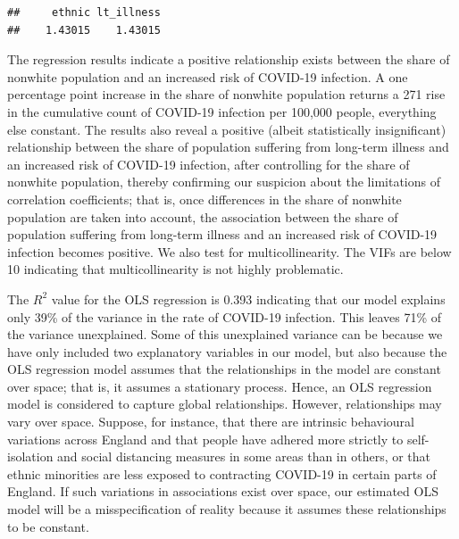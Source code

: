 \documentclass[
]{book}
\begin{document}
\begin{verbatim}
##     ethnic lt_illness 
##    1.43015    1.43015
\end{verbatim}

The regression results indicate a positive relationship exists between the share of nonwhite population and an increased risk of COVID-19 infection. A one percentage point increase in the share of nonwhite population returns a 271 rise in the cumulative count of COVID-19 infection per 100,000 people, everything else constant. The results also reveal a positive (albeit statistically insignificant) relationship between the share of population suffering from long-term illness and an increased risk of COVID-19 infection, after controlling for the share of nonwhite population, thereby confirming our suspicion about the limitations of correlation coefficients; that is, once differences in the share of nonwhite population are taken into account, the association between the share of population suffering from long-term illness and an increased risk of COVID-19 infection becomes positive. We also test for multicollinearity. The VIFs are below 10 indicating that multicollinearity is not highly problematic.

The \(R^{2}\) value for the OLS regression is 0.393 indicating that our model explains only 39\% of the variance in the rate of COVID-19 infection. This leaves 71\% of the variance unexplained. Some of this unexplained variance can be because we have only included two explanatory variables in our model, but also because the OLS regression model assumes that the relationships in the model are constant over space; that is, it assumes a stationary process. Hence, an OLS regression model is considered to capture global relationships. However, relationships may vary over space. Suppose, for instance, that there are intrinsic behavioural variations across England and that people have adhered more strictly to self-isolation and social distancing measures in some areas than in others, or that ethnic minorities are less exposed to contracting COVID-19 in certain parts of England. If such variations in associations exist over space, our estimated OLS model will be a misspecification of reality because it assumes these relationships to be constant.
\end{document}
